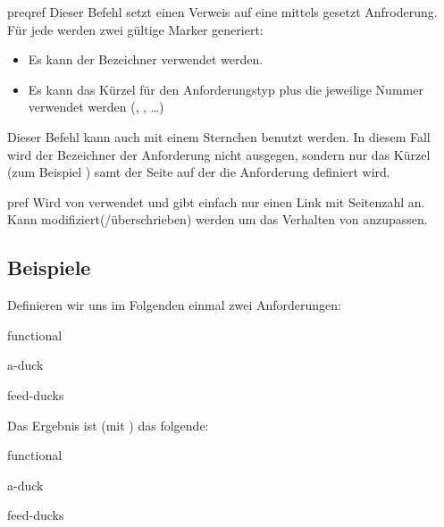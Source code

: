 \documentclass{sopra-base}
\begin{document}
\begin{command}{preqref}{}
    Dieser Befehl setzt einen Verweis auf eine mittels  gesetzt Anfroderung. Für jede werden zwei gültige Marker generiert: \begin{itemize}
        \item Es kann der Bezeichner verwendet werden.
        \item Es kann das Kürzel für den Anforderungstyp plus die jeweilige Nummer verwendet werden (, , \ldots)
    \end{itemize}
    Dieser Befehl kann auch mit einem Sternchen benutzt werden. In diesem Fall wird der
    Bezeichner der Anforderung nicht ausgegen, sondern nur das Kürzel (zum Beispiel ) samt der Seite auf der die Anforderung definiert wird.
\end{command}

\begin{command}{pref}{}
    Wird von  verwendet und gibt einfach nur einen Link mit Seitenzahl an.
    Kann modifiziert(/überschrieben) werden um das Verhalten von  anzupassen.
\end{command}

\subsection{Beispiele}
Definieren wir uns im Folgenden einmal zwei Anforderungen:
\begin{latex}
\begin{requirements}{functional}
    \begin{requirement}{a-duck}
    \end{requirement}

    \begin{requirement}{feed-ducks}
    \end{requirement}
\end{requirements}
\end{latex}
Das Ergebnis ist (mit ) das folgende:
\begin{requirements}{functional}
    \begin{requirement}{a-duck}
    \end{requirement}

    \begin{requirement}{feed-ducks}
    \end{requirement}
\end{requirements}
\end{document}
